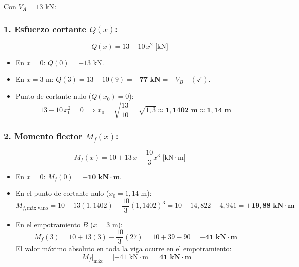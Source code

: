 
Con $V_A = 13\text{ kN}$:
\subsubsection*{1. Esfuerzo cortante $Q(x)$:}
\begin{equation}
    \boxed{Q(x) = 13 - 10\,x^2\text{ [kN]}}
\end{equation}
\begin{itemize}
    \item En $x = 0$: $Q(0) = +13\text{ kN}$.
    \item En $x = 3\text{ m}$: $Q(3) = 13 - 10(9) = \mathbf{-77\text{ kN}} = -V_B \quad (\checkmark)$.
    \item Punto de cortante nulo ($Q(x_0) = 0$):
          \begin{equation}
              13 - 10\,x_0^2 = 0 \implies x_0 = \sqrt{\frac{13}{10}} = \sqrt{1{,}3} \approx \mathbf{1{,}1402\text{ m} \approx 1{,}14\text{ m}}
          \end{equation}
\end{itemize}

\subsubsection*{2. Momento flector $M_f(x)$:}
\begin{equation}
    \boxed{M_f(x) = 10 + 13\,x - \frac{10}{3}x^3\text{ [kN}\cdot\text{m]}}
\end{equation}
\begin{itemize}
    \item En $x = 0$: $M_f(0) = \mathbf{+10\text{ kN}\cdot\text{m}}$.
    \item En el punto de cortante nulo ($x_0 = 1{,}14\text{ m}$):
          \begin{equation}
              M_{f,\text{máx vano}} = 10 + 13(1{,}1402) - \frac{10}{3}(1{,}1402)^3 = 10 + 14{,}822 - 4{,}941 = \mathbf{+19{,}88\text{ kN}\cdot\text{m}}
          \end{equation}
    \item En el empotramiento $B$ ($x = 3\text{ m}$):
          \begin{equation}
              M_f(3) = 10 + 13(3) - \frac{10}{3}(27) = 10 + 39 - 90 = \mathbf{-41\text{ kN}\cdot\text{m}}
          \end{equation}
          El valor máximo absoluto en toda la viga ocurre en el empotramiento:
          \begin{equation}
              |M_f|_{\text{máx}} = |-41\text{ kN}\cdot\text{m}| = \mathbf{41\text{ kN}\cdot\text{m}}
          \end{equation}
\end{itemize}

